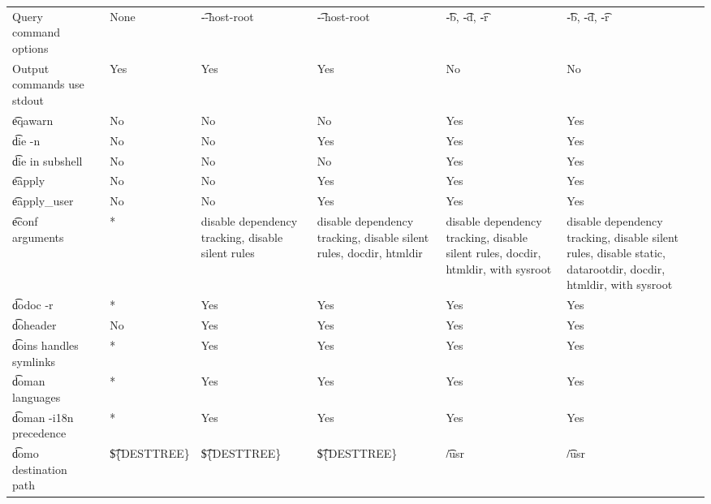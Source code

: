 \begin{landscape}
\begin{longtable}{llP{7.5em}P{7.5em}P{7.5em}P{7.5em}P{7.5em}}
Query command options &  &
    None & \t{-{}-host-root} & \t{-{}-host-root} & \t{-b}, \t{-d}, \t{-r} &
    \t{-b}, \t{-d}, \t{-r} \\

Output commands use stdout &  &
    Yes & Yes & Yes & No & No \\

\t{eqawarn} &  &
    No & No & No & Yes & Yes \\

\t{die -n} &  &
    No & No & Yes & Yes & Yes \\

\t{die} in subshell &  &
    No & No & No & Yes & Yes \\

\t{eapply} &  &
    No & No & Yes & Yes & Yes \\

\t{eapply_user} &  &
    No & No & Yes & Yes & Yes \\

\t{econf} arguments &  &
    * &
    disable dependency tracking, disable silent rules &
    disable dependency tracking, disable silent rules, docdir, htmldir &
    disable dependency tracking, disable silent rules, docdir, htmldir, with sysroot &
    disable dependency tracking, disable silent rules, disable static,
    datarootdir, docdir, htmldir, with sysroot \\

\t{dodoc -r} &  &
    * & Yes & Yes & Yes & Yes \\

\t{doheader} &  &
    No & Yes & Yes & Yes & Yes \\

\t{doins} handles symlinks &  &
    * & Yes & Yes & Yes & Yes \\

\t{doman} languages &  &
    * & Yes & Yes & Yes & Yes \\

\t{doman -i18n} precedence &  &
    * & Yes & Yes & Yes & Yes \\

\t{domo} destination path &  &
    \t{\$\{DESTTREE\}} & \t{\$\{DESTTREE\}} & \t{\$\{DESTTREE\}} & \t{/usr} & \t{/usr} \\


\end{longtable}
\end{landscape}
